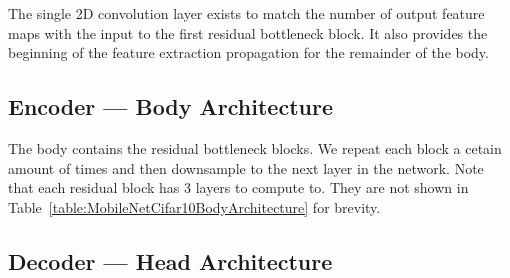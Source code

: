 \documentclass[conference]{IEEEtran}
\begin{document}
The single 2D convolution layer exists to match the number of output feature
maps with the input to the first residual bottleneck block. It also provides the
beginning of the feature extraction propagation for the remainder of the body.



\subsection{Encoder --- Body Architecture} %

\begin{table}[H]
    \centering
    \caption{MobileNet V2 body for CIFAR 10
    dataset.}\label{table:MobileNetCifar10BodyArchitecture}
\end{table}

The body contains the residual bottleneck blocks. We  repeat each block a cetain
amount of times and then downsample to the next layer in the network. Note that
each residual block has 3 layers to compute to. They are not shown in
Table~\ref{table:MobileNetCifar10BodyArchitecture} for brevity.



\subsection{Decoder --- Head Architecture} %
\end{document}
